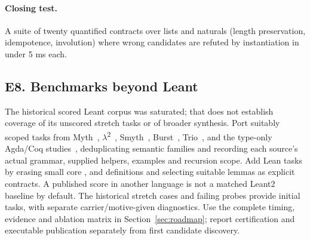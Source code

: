 \paragraph{Closing test.} A suite of twenty quantified contracts over lists and naturals (length preservation, idempotence, involution) where wrong candidates are refuted by instantiation in under 5 ms each.

\subsection{E8. Benchmarks beyond Leant}

The historical scored Leant corpus was saturated; that does not establish
coverage of its unscored stretch tasks or of broader synthesis. Port suitably
scoped tasks from Myth~\cite{myth}, $\lambda$\textsuperscript{2}~\cite{lambda2},
Smyth~\cite{smyth}, Burst~\cite{burst}, Trio~\cite{trio}, and the type-only
Agda/Coq studies~\cite{agsy,sauto}, deduplicating semantic families and recording
each source's actual grammar, supplied helpers, examples and recursion scope.
Add Lean tasks by erasing small core ,  and 
definitions and selecting suitable lemmas as explicit contracts. A published
score in another language is not a matched Leant2 baseline by default.
The historical stretch cases and failing probes provide initial tasks, with
separate carrier/motive-given diagnostics. Use the complete timing, evidence
and ablation matrix in Section~\ref{sec:roadmap}; report certification and
executable publication separately from first candidate discovery.
